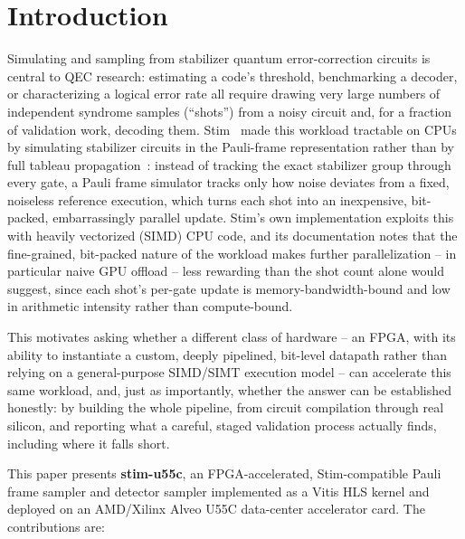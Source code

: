 \documentclass[pdflatex,sn-basic]{sn-jnl}
\begin{document}
\section{Introduction}\label{sec1}

Simulating and sampling from stabilizer quantum error-correction circuits is central to QEC research: estimating a code's threshold, benchmarking a decoder, or characterizing a logical error rate all require drawing very large numbers of independent syndrome samples (``shots'') from a noisy circuit and, for a fraction of validation work, decoding them. Stim~\cite{gidney2021stim} made this workload tractable on CPUs by simulating stabilizer circuits in the Pauli-frame representation rather than by full tableau propagation~\cite{gottesman1998heisenberg,aaronson2004chp}: instead of tracking the exact stabilizer group through every gate, a Pauli frame simulator tracks only how noise deviates from a fixed, noiseless reference execution, which turns each shot into an inexpensive, bit-packed, embarrassingly parallel update. Stim's own implementation exploits this with heavily vectorized (SIMD) CPU code, and its documentation notes that the fine-grained, bit-packed nature of the workload makes further parallelization -- in particular naive GPU offload -- less rewarding than the shot count alone would suggest, since each shot's per-gate update is memory-bandwidth-bound and low in arithmetic intensity rather than compute-bound.

This motivates asking whether a different class of hardware -- an FPGA, with its ability to instantiate a custom, deeply pipelined, bit-level datapath rather than relying on a general-purpose SIMD/SIMT execution model -- can accelerate this same workload, and, just as importantly, whether the answer can be established honestly: by building the whole pipeline, from circuit compilation through real silicon, and reporting what a careful, staged validation process actually finds, including where it falls short.

This paper presents \textbf{stim-u55c}, an FPGA-accelerated, Stim-compatible Pauli frame sampler and detector sampler implemented as a Vitis HLS kernel and deployed on an AMD/Xilinx Alveo U55C data-center accelerator card. The contributions are:
\end{document}
